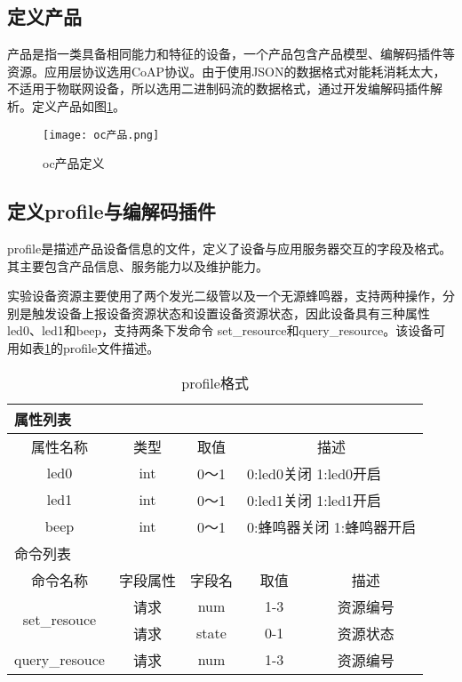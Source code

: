 \subsection{定义产品}
产品是指一类具备相同能力和特征的设备，一个产品包含产品模型、编解码插件等资源。应用层协议选用CoAP协议。由于使用JSON的数据格式对能耗消耗太大，
不适用于物联网设备，所以选用二进制码流的数据格式，通过开发编解码插件解析。定义产品如图\ref{oc产品定义}。
\begin{figure}[H]
    \centering
	\texttt{[image: oc产品.png]}
	\caption{oc产品定义}
	\label{oc产品定义}
\end{figure}


\subsection{定义profile与编解码插件}
profile是描述产品设备信息的文件，定义了设备与应用服务器交互的字段及格式。其主要包含产品信息、服务能力以及维护能力。

实验设备资源主要使用了两个发光二级管以及一个无源蜂鸣器，支持两种操作，分别是触发设备上报设备资源状态和设置设备资源状态，因此设备具有三种属性led0、led1和beep，支持两条下发命令
set\_resource和query\_resource。该设备可用如表\ref{profile格式}的profile文件描述。
\begin{table}[h]
\caption{profile格式}
\begin{tabular}{|c|c|c|c|c|}
\toprule
\multicolumn{5}{|l|}{属性列表} \\
\hline
属性名称 & 类型 & 取值 & \multicolumn{2}{|c|}{描述}  \\
\hline
led0 & int & 0～1 & \multicolumn{2}{|l|}{0:led0关闭 1:led0开启} \\
\hline
led1 & int & 0～1 & \multicolumn{2}{|l|}{0:led1关闭 1:led1开启} \\
\hline
beep & int & 0～1 & \multicolumn{2}{|l|}{0:蜂鸣器关闭 1:蜂鸣器开启} \\
\toprule
\multicolumn{5}{|l|}{命令列表} \\
\hline
命令名称 & 字段属性 & 字段名 & 取值 & 描述 \\
\hline
\multirow{2}{*}{set\_resouce} & 请求 & num & 1-3 & 资源编号 \\
\cmidrule{2-5}
&请求&state&0-1&资源状态 \\
\hline
query\_resouce & 请求 & num & 1-3 & 资源编号 \\
\hline
\bottomrule
\end{tabular}
\label{profile格式}
\end{table}

